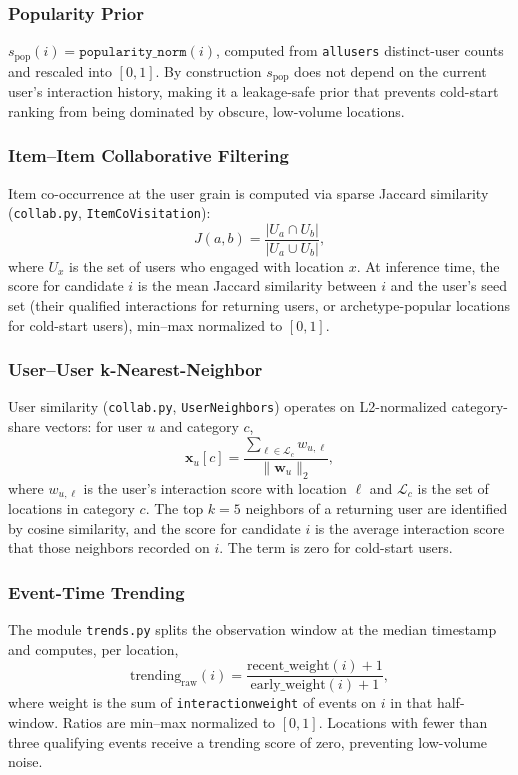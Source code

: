 \documentclass[12pt,letterpaper]{article}
\newcommand{\codeunderscore}{\discretionary{\textunderscore}{}{\textunderscore}}
\newcommand{\code}[1]{\begingroup\let\_\codeunderscore\texttt{\small #1}\endgroup}
\begin{document}
\subsubsection*{Popularity Prior}
$s_\text{pop}(i) = \texttt{popularity\_norm}(i)$, computed from
\code{*\_all\_users} distinct-user counts and rescaled into $[0, 1]$.
By construction $s_\text{pop}$ does not depend on the current user's
interaction history, making it a leakage-safe prior that prevents
cold-start ranking from being dominated by obscure, low-volume
locations.

\subsubsection*{Item--Item Collaborative Filtering}
Item co-occurrence at the user grain is computed via sparse Jaccard
similarity (\code{collab.py}, \code{ItemCoVisitation}):
\begin{equation}
  J(a, b) = \frac{|U_a \cap U_b|}{|U_a \cup U_b|},
\end{equation}
where $U_x$ is the set of users who engaged with location $x$. At
inference time, the score for candidate $i$ is the mean Jaccard
similarity between $i$ and the user's seed set (their qualified
interactions for returning users, or archetype-popular locations for
cold-start users), min--max normalized to $[0, 1]$.

\subsubsection*{User--User k-Nearest-Neighbor}
User similarity (\code{collab.py}, \code{UserNeighbors}) operates on
L2-normalized category-share vectors: for user $u$ and category $c$,
\[
  \bm{x}_u[c] = \frac{\sum_{\ell \in \mathcal{L}_c} w_{u,\ell}}{\lVert \bm{w}_u \rVert_2},
\]
where $w_{u,\ell}$ is the user's interaction score with location
$\ell$ and $\mathcal{L}_c$ is the set of locations in category $c$.
The top $k = 5$ neighbors of a returning user are identified by
cosine similarity, and the score for candidate $i$ is the average
interaction score that those neighbors recorded on $i$. The term is
zero for cold-start users.

\subsubsection*{Event-Time Trending}
The module \code{trends.py} splits the observation window at the
median timestamp and computes, per location,
\begin{equation}
  \text{trending}_\text{raw}(i) =
  \frac{\text{recent\_weight}(i) + 1}
       {\text{early\_weight}(i) + 1},
\end{equation}
where weight is the sum of \code{interaction\_weight} of events on
$i$ in that half-window. Ratios are min--max normalized to $[0, 1]$.
Locations with fewer than three qualifying events receive a trending
score of zero, preventing low-volume noise.
\end{document}
